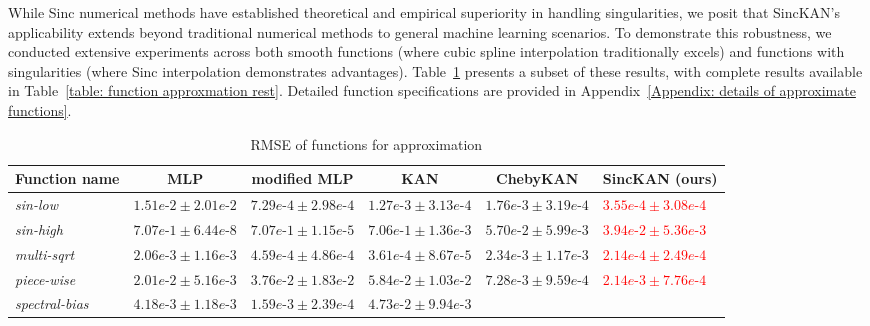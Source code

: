 While Sinc numerical methods have established theoretical and empirical superiority in handling singularities, we posit that SincKAN's applicability extends beyond traditional numerical methods to general machine learning scenarios. To demonstrate this robustness, we conducted extensive experiments across both smooth functions (where cubic spline interpolation traditionally excels) and functions with singularities (where Sinc interpolation demonstrates advantages). Table~\ref{table: function approxmation} presents a subset of these results, with complete results available in Table~\ref{table: function approxmation rest}. Detailed function specifications are provided in Appendix~\ref{Appendix: details of approximate functions}.

\begin{table}[ht]
\caption{RMSE of functions for approximation}
\label{table: function approxmation}
\begin{center}
\begin{adjustbox}{width=\columnwidth, center}
\begin{tabular}{llllll}
\multicolumn{1}{c}{\bf Function name}  & \multicolumn{1}{c}{\bf MLP} & \multicolumn{1}{c}{\bf modified MLP} &\multicolumn{1}{c}{\bf KAN} & \multicolumn{1}{c}{\bf ChebyKAN} & \multicolumn{1}{c}{\bf SincKAN (ours)} 
\\ \hline 
\textit{sin-low} & $1.51 e\mbox{-}2 \pm 2.01 e\mbox{-}2$ & $7.29e\mbox{-}4 \pm 2.98 e\mbox{-}4$ & $1.27e\mbox{-}3 \pm 3.13e\mbox{-}4$ &
$1.76e\mbox{-}3 \pm 3.19e\mbox{-}4$ &
\textcolor{red}{$3.55 e\mbox{-}4 \pm 3.08 e\mbox{-}4$} \\ 
\textit{sin-high} & $7.07e\mbox{-}1 \pm 6.44e\mbox{-}8$ & $7.07 e\mbox{-}1 \pm 1.15 e\mbox{-}5$ & $7.06e\mbox{-}1 \pm 1.36e\mbox{-}3$ &
$5.70e\mbox{-}2 \pm 5.99 e\mbox{-}3$ &
\textcolor{red}{$3.94e\mbox{-}2 \pm 5.36e\mbox{-}3$} \\ 
\textit{multi-sqrt} & $2.06e\mbox{-}3 \pm 1.16e\mbox{-}3$ & $4.59e\mbox{-}4 \pm 4.86e\mbox{-}4$ & $3.61e\mbox{-}4 \pm 8.67 e\mbox{-}5$ &
$2.34e\mbox{-}3 \pm 1.17e\mbox{-}3$ &
\textcolor{red}{$2.14e\mbox{-}4 \pm 2.49 e\mbox{-}4$} \\ 
\textit{piece\mbox{-}wise} & $2.01e\mbox{-}2 \pm 5.16e\mbox{-}3$ & $3.76e\mbox{-}2 \pm 1.83e\mbox{-}2$ & $5.84e\mbox{-}2 \pm 1.03e\mbox{-}2$ &
$7.28e\mbox{-}3 \pm 9.59 e\mbox{-}4$ &
\textcolor{red}{$2.14e\mbox{-}3 \pm 7.76e\mbox{-}4$} \\ 
\textit{spectral-bias} & $4.18e\mbox{-}3 \pm 1.18 e\mbox{-}3$ & $1.59e\mbox{-}3 \pm 2.39e\mbox{-}4$ & $4.73e\mbox{-}2 \pm 9.94 e\mbox{-}3$ &

\end{tabular}
\end{adjustbox}
\end{center}
\end{table}
